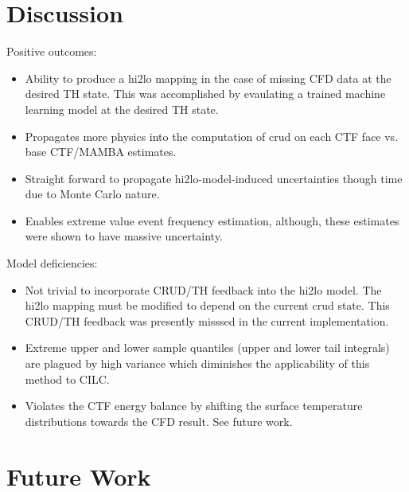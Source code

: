 
\section{Discussion}

Positive outcomes:

\begin{itemize}
	\item  Ability to produce a hi2lo mapping in the case of missing CFD data at the desired TH state.
                This was accomplished by evaulating a trained machine learning model at the desired TH state.
	\item  Propagates more physics into the computation of crud on each CTF face vs. base CTF/MAMBA estimates.
	\item  Straight forward to propagate hi2lo-model-induced uncertainties though time due to Monte Carlo nature.
	\item  Enables extreme value event frequency estimation, although, these estimates were shown to have massive uncertainty.
\end{itemize}

\noindent Model deficiencies:  

\begin{itemize}
	\item  Not trivial to incorporate CRUD/TH feedback into the hi2lo model.  The hi2lo mapping must be modified to depend on the current crud state.  This CRUD/TH feedback was presently misssed in the current implementation.
	\item  Extreme upper and lower sample quantiles (upper and lower tail integrals) are plagued by high variance which diminishes the applicability of this method to CILC.  
        \item Violates the CTF energy balance by shifting the surface temperature distributions towards the CFD result.  See future work.
\end{itemize}

\section{Future Work}

